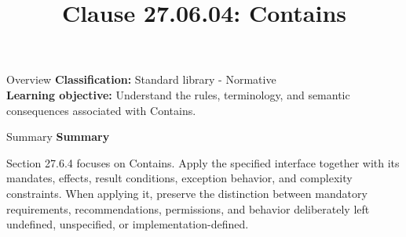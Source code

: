 \documentclass[10pt,letterpaper]{article}
\title{Clause 27.06.04: Contains}
\author{}
\date{}
\begin{document}
\maketitle
\begin{CornellOverviewBox}{Overview}
\textbf{Classification:} Standard library - Normative\\[2pt]
\textbf{Learning objective:} Understand the rules, terminology, and semantic consequences associated with Contains.
\end{CornellOverviewBox}\begin{CornellSummaryBox}{Summary}
{\sffamily\bfseries\color{Accent} Summary}\par\vspace{3pt}Section 27.6.4 focuses on Contains. Apply the specified interface together with its mandates, effects, result conditions, exception behavior, and complexity constraints. When applying it, preserve the distinction between mandatory requirements, recommendations, permissions, and behavior deliberately left undefined, unspecified, or implementation-defined.
\end{CornellSummaryBox}
\end{document}
